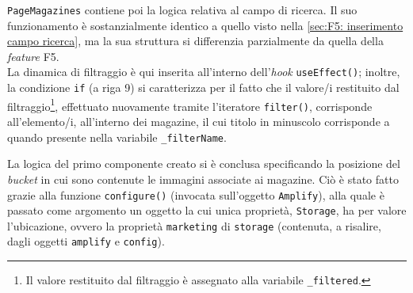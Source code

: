 
\texttt{PageMagazines} contiene poi la logica relativa al campo di ricerca. Il suo funzionamento è sostanzialmente identico a quello visto nella \autoref{sec:F5: inserimento campo ricerca}, ma la sua struttura si differenzia parzialmente da quella della \textit{feature} F5.\\
La dinamica di filtraggio è qui inserita all'interno dell'\textit{hook} \texttt{useEffect()}; inoltre, la condizione \texttt{if} (a riga 9) si caratterizza per il fatto che il valore/i restituito dal filtraggio\footnote{Il valore restituito dal filtraggio è assegnato alla variabile \texttt{\_filtered}.}, effettuato nuovamente tramite l'iteratore \texttt{filter()}, corrisponde all'elemento/i, all'interno dei magazine, il cui titolo in minuscolo corrisponde a quando presente nella variabile \texttt{\_filterName}. 


La logica del primo componente creato si è conclusa specificando la posizione del \textit{bucket} in cui sono contenute le immagini associate ai magazine. Ciò è stato fatto grazie alla funzione \texttt{configure()} (invocata sull'oggetto \texttt{Amplify}), alla quale è passato come argomento un oggetto la cui unica proprietà, \texttt{Storage}, ha per valore l'ubicazione, ovvero la proprietà \texttt{marketing} di \texttt{storage} (contenuta, a risalire, dagli oggetti \texttt{amplify} e \texttt{config}). 

